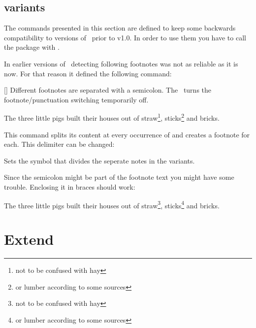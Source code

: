 \documentclass{fnpct-manual}
\begin{document}
\subsection{ variants}

\begin{bewareofthedog}
  The commands presented in this section are defined to keep some backwards
  compatibility to versions of \fnpct\ prior to v1.0.  In order to use them
  you have to call the package with
  .
\end{bewareofthedog}
In earlier versions of \fnpct\ detecting following footnotes was not as
reliable as it is now.  For that reason it defined the following command:
\begin{commands}
  [\sarg{}]
    Different footnotes are separated with a semicolon.  The \sarg\ turns the
    footnote/punctuation switching temporarily off.
\end{commands}
\begin{example}
  The three little pigs built their houses out of straw\footnote{not to be
    confused with hay}, sticks\footnote{or lumber according to some sources}
  and bricks.
\end{example}
This command splits its content at every occurrence of \code{;} and creates a
footnote for each.  This delimiter can be changed:
\begin{options}
  \Default{;}
    Sets the symbol that divides the seperate notes in the 
    variants.
\end{options}

Since the semicolon might be part of the footnote text you might have some
trouble.  Enclosing it in braces should work:
\begin{example}
  The three little pigs built their houses out of straw\footnote{not to be
    confused with hay}, sticks\footnote{or lumber according to some sources}
  and bricks.
\end{example}

\section{Extend \fnpct}
\end{document}
